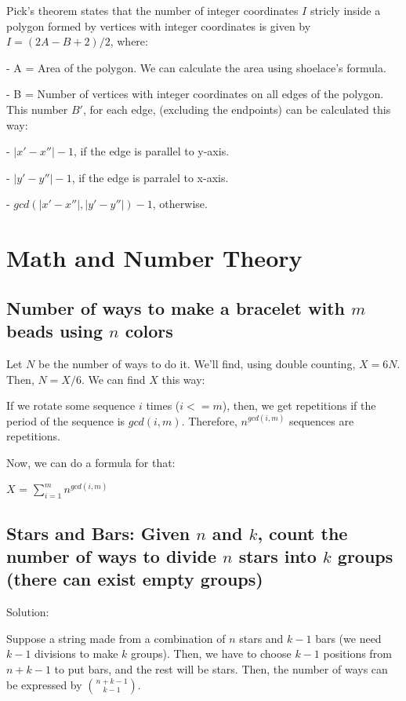 \documentclass[12pt]{article}%
\begin{document}
Pick's theorem states that the number of integer coordinates $I$ stricly inside a polygon formed by vertices with integer coordinates is given by $I = (2A - B + 2)/2$, where:

- A = Area of the polygon. We can calculate the area using shoelace's formula.

- B = Number of vertices with integer coordinates on all edges of the polygon. This number $B'$, for each edge, (excluding the endpoints) can be calculated this way: 

\hspace{2mm} - $|x' - x''| - 1$, if the edge is parallel to y-axis.
    
\hspace{2mm} - $|y' - y''| - 1$, if the edge is parralel to x-axis.
    
\hspace{2mm} - $gcd(|x' - x''|, |y' - y''|) - 1$, otherwise.
 
\section{Math and Number Theory}

\subsection{Number of ways to make a bracelet with $m$ beads using $n$ colors}

Let $N$ be the number of ways to do it. We'll find, using double counting, $X = 6N$. Then, $N = X/6$. We can find $X$ this way:

If we rotate some sequence $i$ times ($i <= m$), then, we get repetitions if the period of the sequence is $gcd(i,m)$. Therefore, $n^{gcd(i,m)}$ sequences are repetitions.

Now, we can do a formula for that:

$X$ = $\sum_{i = 1}^{m} n^{gcd(i,m)}$

\subsection{Stars and Bars: Given $n$ and $k$, count the number of ways to divide $n$ stars into $k$ groups (there can exist empty groups)}

Solution:

Suppose a string made from a combination of $n$ stars and $k-1$ bars (we need $k-1$ divisions to make $k$ groups). Then, we have to choose $k-1$ positions from $n+k-1$ to put bars, and the rest will be stars. Then, the number of ways can be expressed by ${n+k-1}\choose{k-1}$.    
\end{document}
